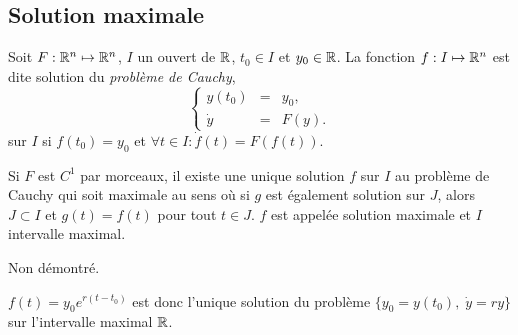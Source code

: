 \subsection{Solution maximale} 

\begin{definition}
  Soit $F : \mathbb{R}^n \mapsto \mathbb{R}^n$, $I$ un ouvert de $\mathbb{R}$, $t_0 \in I$ et $y_0 \in \mathbb{R}$. La fonction $f : I \mapsto \mathbb{R}^n$ est dite solution du \emph{problème de Cauchy}, 
  $$
  \left\{\begin{array}{rcl}
          y(t_0) & = & y_0, \\
          \dot y & = & F(y).
        \end{array}\right.
  $$
  sur $I$ si $f(t_0) = y_0$ et $\forall t \in I: \dot f(t) = F(f(t))$.
\end{definition}

\begin{theorem}
  Si $F$ est $C^1$ par morceaux, il existe une unique solution $f$ sur $I$ au problème de Cauchy qui soit maximale au sens où si $g$ est également solution sur $J$, alors $J \subset I$ et $g(t) = f(t)$ pour tout $t \in J$. $f$ est appelée solution maximale et $I$ intervalle maximal.
\end{theorem}

\proof Non démontré. \eproof

\remark
$f(t) = y_0 e^{r(t-t_0)}$ est donc l'unique solution du problème $\{y_0 = y(t_0), \; \dot y = r y\}$ sur l'intervalle maximal $\mathbb{R}$.


